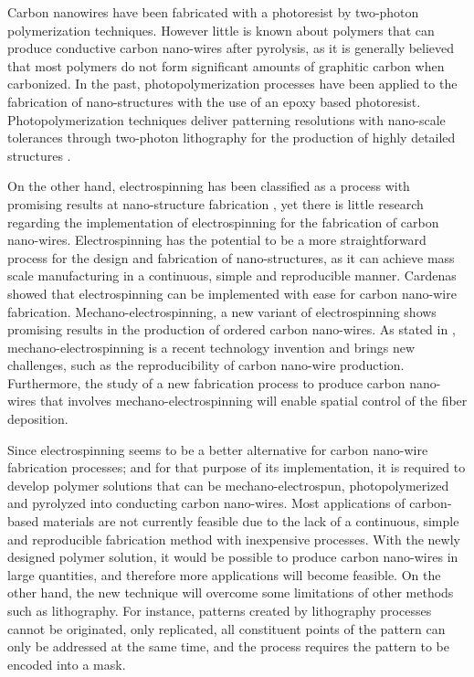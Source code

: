 Carbon nanowires have been fabricated with a photoresist by two-photon polymerization techniques. However little is known about polymers that can produce conductive carbon nano-wires after pyrolysis, as it is generally believed that most polymers do not form significant amounts of graphitic carbon when carbonized.
In the past, photopolymerization processes have been applied to the fabrication of nano-structures with the use of an epoxy based photoresist. \cite{Boer2014} Photopolymerization techniques deliver patterning resolutions with nano-scale tolerances through two-photon lithography for the production of highly detailed structures \cite{Hribar2014}.

On the other hand, electrospinning has been classified as a process with promising results at nano-structure fabrication \cite{Boer2014}, yet there is little research regarding the implementation of electrospinning for the fabrication of carbon nano-wires. Electrospinning has the potential to be a more straightforward process for the design and fabrication of nano-structures, as it can achieve mass scale manufacturing in a continuous, simple and reproducible manner. Cardenas \cite{Cardenas2017} showed that electrospinning can be implemented with ease for carbon nano-wire fabrication. Mechano-electrospinning, a new variant of electrospinning shows promising results in the production of ordered carbon nano-wires. As stated in \cite{Cardenas2017}, mechano-electrospinning is a recent technology invention and brings new challenges, such as the reproducibility of carbon nano-wire production. Furthermore, the study of a new fabrication process to produce carbon nano-wires that involves mechano-electrospinning will enable spatial control of the fiber deposition.

Since electrospinning seems to be a better alternative for carbon nano-wire fabrication processes; and for that purpose of its implementation, it is required to develop polymer solutions that can be mechano-electrospun, photopolymerized and pyrolyzed into conducting carbon nano-wires. Most applications of carbon-based materials are not currently feasible due to the lack of a continuous, simple and reproducible fabrication method with inexpensive processes. With the newly designed polymer solution, it would be possible to produce carbon nano-wires in large quantities, and therefore more applications will become feasible. On the other hand, the new technique will overcome some limitations of other methods such as lithography. For instance, patterns created by lithography processes cannot be originated, only replicated, all constituent points of the pattern can only be addressed at the same time, and the process requires the pattern to be encoded into a mask. \cite{Landis2011}


